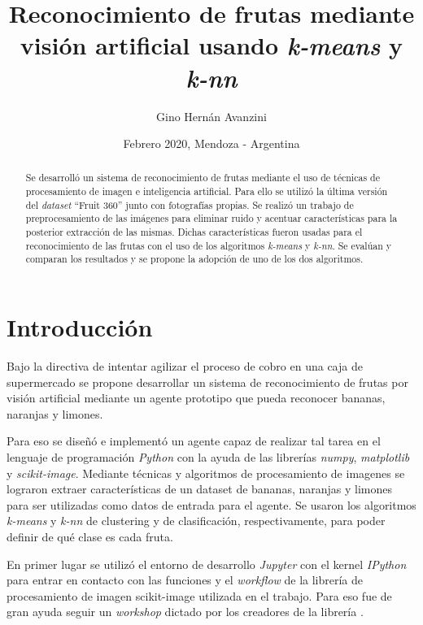 \documentclass[10pt, a4paper]{article}
\title{Reconocimiento de frutas mediante visión artificial usando \textit{k-means} y \textit{k-nn}}
\author[1]{Gino Hernán Avanzini}
\affil[1]{Facultad de Ingeniería - Universidad Nacional de Cuyo}
\date{Febrero 2020, Mendoza - Argentina}
\begin{document}
\maketitle

\begin{abstract}

Se desarrolló un sistema de reconocimiento de frutas mediante el uso de técnicas de procesamiento de imagen e inteligencia artificial. Para ello se utilizó la última versión del \textit{dataset} ``Fruit 360'' junto con fotografías propias. Se realizó un trabajo de preprocesamiento de las imágenes para eliminar ruido y acentuar características para la posterior extracción de las mismas. Dichas características fueron usadas para el reconocimiento de las frutas con el uso de los algoritmos \textit{
k-means} y \textit{k-nn}. Se evalúan y comparan los resultados y se propone la adopción de uno de los dos algoritmos. 

\end{abstract}

\section{Introducción}

Bajo la directiva de intentar agilizar el proceso de cobro en una caja de supermercado se propone desarrollar un sistema de reconocimiento de frutas por visión artificial mediante un agente prototipo que pueda reconocer bananas, naranjas y limones.

Para eso se diseñó e implementó un agente capaz de realizar tal tarea en el lenguaje de programación \textit{Python} con la ayuda de las librerías \textit{numpy}, \textit{matplotlib} y \textit{scikit-image}. Mediante técnicas y algoritmos de procesamiento de imagenes se lograron extraer características de un dataset de bananas, naranjas y limones para ser utilizadas como datos de entrada para el agente. Se usaron los algoritmos \textit{k-means} y \textit{k-nn} de clustering y de clasificación, respectivamente, para poder definir de qué clase es cada fruta.

En primer lugar se utilizó el entorno de desarrollo \textit{Jupyter} con el kernel \textit{IPython} para entrar en contacto con las funciones y el \textit{workflow} de la librería de procesamiento de imagen scikit-image \cite{scikit-image} utilizada en el trabajo. Para eso fue de gran ayuda seguir un \textit{workshop} dictado por los creadores de la librería \cite{skimage-tutorial}.
\end{document}
